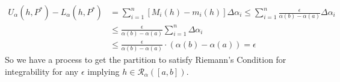 \documentclass[12pt]{article}
\theoremstyle{plain}
\theoremstyle{definition}
\theoremstyle{remark}
\begin{document}
\begin{enumerate}
\begin{enumerate}
            \begin{align*}
                U_\alpha(h,P^*) - L_\alpha(h,P^*) &=
                \sum^n_{i=1} [M_i(h) - m_i(h)] \Delta\alpha_i 
                \leq \sum^n_{i=1} 
                    \frac{\epsilon}{\alpha(b)-\alpha(a)}
                    \Delta\alpha_i \\
                &\leq  \frac{\epsilon}{\alpha(b)-\alpha(a)}
                    \sum^n_{i=1} \Delta\alpha_i \\
                &\leq \frac{\epsilon}{\alpha(b)-\alpha(a)} \cdot
                    (\alpha(b) - \alpha(a)) 
                = \epsilon
            \end{align*}
            So we have a process to get the partition 
            to satisfy Riemann's Condition for integrability
            for any $\epsilon$ implying $h\in 
            \mathscr{R}_\alpha([a,b])$.
            

\end{enumerate}
\end{enumerate}
\end{document}
